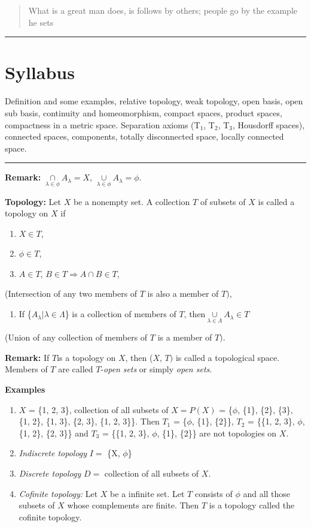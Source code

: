 \documentclass[12pt]{amsart}
\begin{document}
\begin{quote}
What is a great man does, is follows by others; people go by the example he sets
\end{quote}

\hrule
\section*{Syllabus}
Definition and some examples, relative topology, weak topology, open basis, open sub basis, continuity and homeomorphism, compact spaces, product 
spaces, compactness in a metric space.
Separation axioms (T$_{1}$, T$_{2}$, T$_{3}$, Housdorff spaces), connected spaces, components, totally disconnected space, locally connected space.
\hrule
\vspace{1cm}

\textbf{Remark:} $\mathop \cap \limits_{\lambda \in \phi } A_\lambda  = X$, 
$\mathop \cup \limits_{\lambda \in \phi } A_\lambda =\phi $.

\textbf{Topology:} Let $X$ be a nonempty set. A collection $T$ of subsets of $X$ is 
called a topology on $X$ if 

\begin{enumerate}
\item $X \in T$, 
\item $\phi 
\in T$,
\item $A \in T$, $B\in T \Rightarrow A\cap B\in T$,
\end{enumerate}
(Intersection of any two members of $T$ is also a member of $T )$, 

\begin{enumerate}
\item If {\{}$A_\lambda \vert \lambda \in \Lambda ${\}} is a collection of members of $T$, then$\mathop \cup \limits_{\lambda \in \Lambda } A_\lambda \in T$ 
\end{enumerate}
(Union of any collection of members of $T$ is a member of $T )$.

\textbf{Remark:} If $T $is a topology on $X$, then ($X$, $T )$ is called a topological 
space. Members of $T$ are called $T$-\textit{open} \textit{sets} or simply \textit{open sets}.

\textbf{Examples}

\begin{enumerate}
\item $X$ = {\{}1, 2, 3{\}}, collection of all subsets of $X = P (X)$ = {\{}$\phi $, {\{}1{\}}, {\{}2{\}}, {\{}3{\}}, {\{}1, 2{\}}, {\{}1, 3{\}}, {\{}2, 3{\}}, {\{}1, 2, 3{\}}{\}}. Then $T_{1}$ = {\{}$\phi $, {\{}1{\}}, {\{}2{\}}{\}}, $T_{2}$ = {\{}{\{}1, 2, 3{\}}, $\phi $, {\{}1, 2{\}}, {\{}2, 3{\}}{\}} and $T_{3}$ = {\{}{\{}1, 2, 3{\}}, $\phi $, {\{}1{\}}, {\{}2{\}}{\}} are not topologies on $X$.
\item \textit{Indiscrete topology} $I =$ {\{}X, $\phi ${\}}
\item \textit{Discrete topology} $D =$ collection of all subsets of $X$.
\item \textit{Cofinite topology:} Let $X$ be a infinite set. Let $T$ consists of $\phi $ and all those subsets of $X$ whose complements are finite. Then $T$ is a topology called the cofinite topology.
\end{enumerate}
\end{document}
